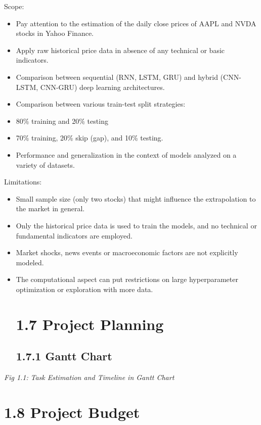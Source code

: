 \documentclass[12pt,a4paper]{report}
\begin{document}
Scope:

\begin{itemize}
  \item Pay attention to the estimation of the daily close prices of AAPL and NVDA stocks in Yahoo Finance. 
  \item Apply raw historical price data in absence of any technical or basic indicators. 
  \item Comparison between sequential (RNN, LSTM, GRU) and hybrid (CNN-LSTM, CNN-GRU) deep learning architectures. 
  \item Comparison between various train-test split strategies: 
  \item 80\% training and 20\% testing 
  \item 70\% training, 20\% skip (gap), and 10\% testing. 
  \item Performance and generalization in the context of models analyzed on a variety of datasets. 
\end{itemize}

Limitations: 

\begin{itemize}
  \item Small sample size (only two stocks) that might influence the extrapolation to the market in general. 
  \item Only the historical price data is used to train the models, and no technical or fundamental indicators are employed. 
  \item Market shocks, news events or macroeconomic factors are not explicitly modeled. 
  \item The computational aspect can put restrictions on large hyperparameter optimization or exploration with more data.
\section{1.7 Project Planning}
\subsection{1.7.1 Gantt Chart}
\end{itemize}

\begin{center}
\textit{Fig 1.1: }\textit{Task Estimation and Timeline in Gantt Chart}
\end{center}
\section{1.8 Project Budget}
\end{document}
